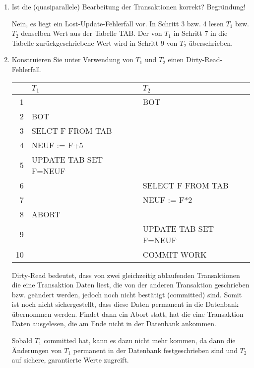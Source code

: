 \documentclass{bschlangaul-aufgabe}
\begin{document}
\begin{enumerate}

%

\item Ist die (quasiparallele) Bearbeitung der Transaktionen korrekt?
Begründung!

\begin{bAntwort}
Nein, es liegt ein Lost-Update-Fehlerfall vor. In Schritt 3 bzw. 4 lesen
$T_1$ bzw. $T_2$ denselben Wert aus der Tabelle TAB. Der von $T_1$ in
Schritt 7 in die Tabelle zurückgeschriebene Wert wird in Schritt 9 von
$T_2$ überschrieben.
\end{bAntwort}

%

\item Konstruieren Sie unter Verwendung von $T_1$ und $T_2$ einen
Dirty-Read-Fehlerfall.

\begin{bAntwort}

\begin{center}
\begin{tabular}{|r|l|l|}
\hline
   & $T_1$                 & $T_2$                 \\\hline\hline
1  &                       & BOT                   \\\hline
2  & BOT                   &                       \\\hline
3  & SELCT F FROM TAB      &                       \\\hline
4  & NEUF := F+5           &                       \\\hline
5  & UPDATE TAB SET F=NEUF &                       \\\hline
6  &                       & SELECT F FROM TAB     \\\hline
7  &                       & NEUF := F*2           \\\hline
8  & ABORT                 &                       \\\hline
9  &                       & UPDATE TAB SET F=NEUF \\\hline
10 &                       & COMMIT WORK           \\\hline
\end{tabular}
\end{center}

Dirty-Read bedeutet, dass von zwei gleichzeitig ablaufenden
Transaktionen die eine Transaktion Daten liest, die von der anderen
Transaktion geschrieben bzw. geändert werden, jedoch noch nicht
bestätigt (committed) sind. Somit ist noch nicht sichergestellt, dass
diese Daten permanent in die Datenbank übernommen werden. Findet dann
ein Abort statt, hat die eine Transaktion Daten ausgelesen, die am Ende
nicht in der Datenbank ankommen.

Sobald $T_1$ committed hat, kann es dazu nicht mehr kommen, da dann die
Änderungen von $T_1$ permanent in der Datenbank festgeschrieben sind und
$T_2$ auf sichere, garantierte Werte zugreift.
\end{bAntwort}
\end{enumerate}
\end{document}
